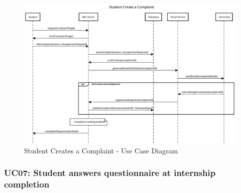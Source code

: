 \begin{figure}[H]
    \centering
    \includegraphics[width=1.0\textwidth]{Images/UC_6.pdf}
    \caption{Student Creates a Complaint - Use Case Diagram}
    \label{fig:use-case-diagram-6}
\end{figure}


\subsubsection{UC07: Student answers questionnaire at internship completion}
\label{subsubsec:student-answers-questionnaire-at-internship-completion}

